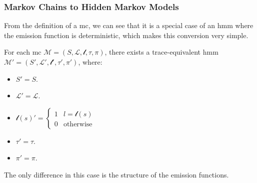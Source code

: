 \subsubsection{Markov Chains to Hidden Markov Models}\label{subsec:mc2hmm}
From the definition of a \gls{mc}, we can see that it is a special case of an \gls{hmm} where the emission function is deterministic, which makes this conversion very simple.


\begin{definition}
    For each \gls{mc} $\mathcal{M} = (S, \mathcal{L}, \mathscr{l}, \tau,  \pi)$, there exists a trace-equivalent \gls{hmm} $\mathcal{M}' = (S', \mathcal{L}', \mathscr{l}', \tau',  \pi')$, where:
    \begin{itemize}
        \item $S' = S$.
        \item $\mathcal{L}' = \mathcal{L}$.
        \item $\mathscr{l}(s)' =  \begin{cases}
                      1 & l=\mathscr{l}(s) \\
                      0 & \text{otherwise}
                  \end{cases}$
        \item $\tau' = \tau$.
        \item $\pi' = \pi$.
    \end{itemize}
\end{definition}


The only difference in this case is the structure of the emission functions.

